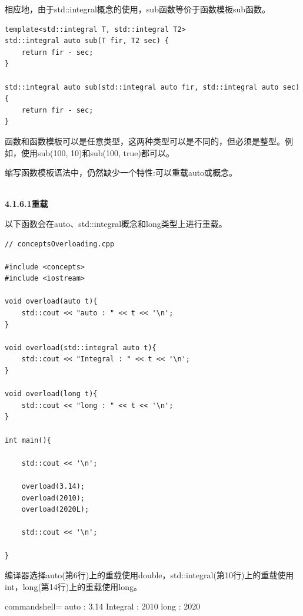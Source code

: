 相应地，由于std::integral概念的使用，sub函数等价于函数模板sub函数。

\begin{lstlisting}[style=styleCXX]
template<std::integral T, std::integral T2>
std::integral auto sub(T fir, T2 sec) {
	return fir - sec;
}

std::integral auto sub(std::integral auto fir, std::integral auto sec) {
	return fir - sec;
}
\end{lstlisting}

函数和函数模板可以是任意类型，这两种类型可以是不同的，但必须是整型。例如，使用sub(100, 10)和sub(100, true)都可以。

缩写函数模板语法中，仍然缺少一个特性:可以重载auto或概念。

\hspace*{\fill} \\ %
\noindent
\textbf{4.1.6.1\hspace{0.2cm}重载}

以下函数会在auto、std::integral概念和long类型上进行重载。

\begin{lstlisting}[style=styleCXX]
// conceptsOverloading.cpp

#include <concepts>
#include <iostream>

void overload(auto t){
	std::cout << "auto : " << t << '\n';
}

void overload(std::integral auto t){
	std::cout << "Integral : " << t << '\n';
}

void overload(long t){
	std::cout << "long : " << t << '\n';
}

int main(){

	std::cout << '\n';

	overload(3.14);
	overload(2010);
	overload(2020L);

	std::cout << '\n';

}
\end{lstlisting}

编译器选择auto(第6行)上的重载使用double，std::integral(第10行)上的重载使用int，long(第14行)上的重载使用long。

\begin{tcblisting}{commandshell={}}
auto : 3.14
Integral : 2010
long : 2020
\end{tcblisting}

